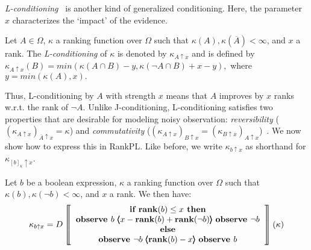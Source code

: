 \documentclass{llncs}
\newcommand{\mods}[2]{[#2]_{#1}}
\newcommand{\Rank}[1]{\hspace{3pt} \pmb{\langle} #1 \pmb{\rangle}\hspace{3pt} } %
\newcommand{\States}{\Omega}
\begin{document}
\emph{L-conditioning}~\cite{goldszmidt1996qualitative} %
is another kind of generalized conditioning.
Here, the parameter $x$ characterizes the `impact' of the evidence. %
\begin{definition}\label{defn:evidenceoriented}
Let $A \in \Omega$, $\kappa$ a ranking function over $\Omega$ such that $\kappa(A), \kappa(\overline A) < \infty$, and $x$ a rank.
The \emph{L-conditioning} of $\kappa$ is denoted by $\kappa_{A \uparrow x}$ and is defined by
	$\kappa_{A \uparrow x}(B) = min ( \kappa(A \cap B) - y, \kappa(\neg A \cap B) + x - y ),$ %
where $y = min(\kappa(A), x).$
\end{definition}
Thus, L-conditioning by $A$ with strength $x$ means that $A$ improves by $x$ ranks w.r.t. the rank of $\neg A$.
Unlike J-conditioning, L-conditioning satisfies two properties 
that are desirable for modeling noisy observation:
	\textit{reversibility} ($(\kappa_{A \uparrow x})_{\overline{A} \uparrow x} = \kappa$) and 
	\textit{commutativity} ($(\kappa_{A \uparrow x})_{B \uparrow x} = (\kappa_{B \uparrow x})_{A \uparrow x}$)~\cite{DBLP:books/daglib/0035277}.
We now show how to express this in RankPL.
Like before, we write $\kappa_{b \uparrow x}$ as shorthand for $\kappa_{\mods{\kappa}{b} \uparrow x}$.
\begin{theorem}\label{thm:evidenceoriented}
Let $b$ be a boolean expression, $\kappa$ a ranking function over $\States$ such that $\kappa(b), \kappa(\neg b) < \infty$, and $x$ a rank.
We then have:
	$$\kappa_{b \uparrow x} = D
	\left\llbracket\begin{tabular}{c} 
	\mbox{$\textbf{if rank}(b) \leq x\textbf{ then}$} \\
	\mbox{$\textbf{observe }b \Rank{x - \textbf{rank}(b) + \textbf{rank}(\neg b)} \textbf{observe }\neg b$} \\
	\mbox{$\textbf{else}$} \\
	\mbox{$\textbf{observe }\neg b \Rank{\textbf{rank}(b) - x} \textbf{observe }b$} \\
	\end{tabular}\right\rrbracket(\kappa)$$
\end{theorem}
\end{document}
